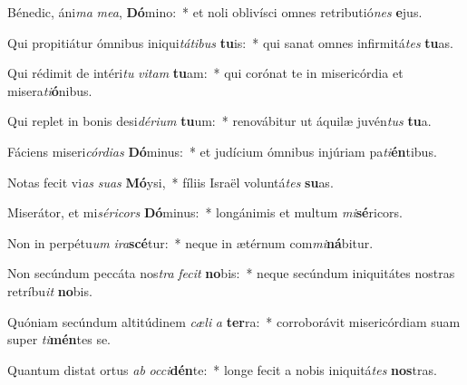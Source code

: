 \item Bénedic, áni\textit{ma} \textit{me}\textit{a}, \textbf{Dó}mino:~* et noli oblivísci omnes retributió\textit{nes} \textbf{e}jus.
\item Qui propitiátur ómnibus iniqui\textit{tá}\textit{ti}\textit{bus} \textbf{tu}is:~* qui sanat omnes infirmitá\textit{tes} \textbf{tu}as.
\item Qui rédimit de intéri\textit{tu} \textit{vi}\textit{tam} \textbf{tu}am:~* qui corónat te in misericórdia et misera\textit{ti}\textbf{ó}nibus.
\item Qui replet in bonis desi\textit{dé}\textit{ri}\textit{um} \textbf{tu}um:~* renovábitur ut áquilæ juvén\textit{tus} \textbf{tu}a.
\item Fáciens miseri\textit{cór}\textit{di}\textit{as} \textbf{Dó}minus:~* et judícium ómnibus injúriam pa\textit{ti}\textbf{én}tibus.
\item Notas fecit vi\textit{as} \textit{su}\textit{as} \textbf{Mó}ysi,~* fíliis Israël voluntá\textit{tes} \textbf{su}as.
\item Miserátor, et mi\textit{sé}\textit{ri}\textit{cors} \textbf{Dó}minus:~* longánimis et multum \textit{mi}\textbf{sé}ricors.
\item Non in perpétu\textit{um} \textit{i}\textit{ra}\textbf{scé}tur:~* neque in ætérnum com\textit{mi}\textbf{ná}bitur.
\item Non secúndum peccáta nos\textit{tra} \textit{fe}\textit{cit} \textbf{no}bis:~* neque secúndum iniquitátes nostras retríbu\textit{it} \textbf{no}bis.
\item Quóniam secúndum altitúdinem \textit{cæ}\textit{li} \textit{a} \textbf{ter}ra:~* corroborávit misericórdiam suam super \textit{ti}\textbf{mén}tes se.
\item Quantum distat ortus \textit{ab} \textit{oc}\textit{ci}\textbf{dén}te:~* longe fecit a nobis iniquitá\textit{tes} \textbf{nos}tras.
